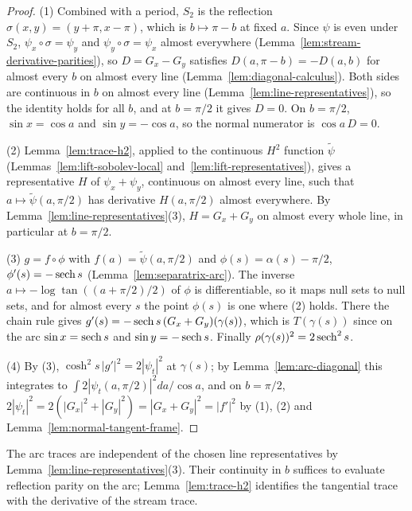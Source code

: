 \begin{proof}
\leanok
(1) Combined with a period, $S_2$ is the reflection $\sigma(x,y)=(y+\pi,x-\pi)$, which is
$b\mapsto\pi-b$ at fixed $a$. Since $\psi$ is even under $S_2$, $\psi_x\circ\sigma=\psi_y$ and
$\psi_y\circ\sigma=\psi_x$ almost everywhere (Lemma~\ref{lem:stream-derivative-parities}), so
$D=G_x-G_y$ satisfies $D(a,\pi-b)=-D(a,b)$ for almost every $b$ on almost every line
(Lemma~\ref{lem:diagonal-calculus}). Both sides are continuous in $b$ on almost every line
(Lemma~\ref{lem:line-representatives}), so the identity holds for all $b$, and at $b=\pi/2$ it
gives $D=0$. On $b=\pi/2$, $\sin x=\cos a$ and $\sin y=-\cos a$, so the normal numerator is
$\cos a\,D=0$.

(2) Lemma~\ref{lem:trace-h2}, applied to the continuous $H^2$ function $\tilde\psi$
(Lemmas~\ref{lem:lift-sobolev-local} and~\ref{lem:lift-representatives}), gives a representative
$H$ of $\psi_x+\psi_y$, continuous on almost every line, such that $a\mapsto\tilde\psi(a,\pi/2)$
has derivative $H(a,\pi/2)$ almost everywhere. By
Lemma~\ref{lem:line-representatives}(3), $H=G_x+G_y$ on almost every whole line, in particular
at $b=\pi/2$.

(3) $g=f\circ\phi$ with $f(a)=\tilde\psi(a,\pi/2)$ and $\phi(s)=\alpha(s)-\pi/2$,
$\phi'(s)=-\operatorname{sech} s$ (Lemma~\ref{lem:separatrix-arc}). The inverse
$a\mapsto-\log\tan((a+\pi/2)/2)$ of $\phi$ is differentiable, so it maps null sets to null
sets, and for almost every $s$ the point $\phi(s)$ is one where (2) holds. There the chain rule
gives $g'(s)=-\operatorname{sech} s\,(G_x+G_y)(\gamma(s))$, which is $T(\gamma(s))$ since on the arc
$\sin x=\operatorname{sech} s$ and $\sin y=-\operatorname{sech} s$. Finally $\rho(\gamma(s))^2=2\operatorname{sech}^2s$.

(4) By (3), $\cosh^2s\,|g'|^2=2|\psi_t|^2$ at $\gamma(s)$; by Lemma~\ref{lem:arc-diagonal} this
integrates to $\int 2|\psi_t(a,\pi/2)|^2da/\cos a$, and on $b=\pi/2$,
$2|\psi_t|^2=2(|G_x|^2+|G_y|^2)=|G_x+G_y|^2=|f'|^2$ by (1), (2) and
Lemma~\ref{lem:normal-tangent-frame}.
\end{proof}

\begin{remark}
The arc traces are independent of the chosen line representatives by
Lemma~\ref{lem:line-representatives}(3). Their continuity in $b$ suffices
to evaluate reflection parity on the arc; Lemma~\ref{lem:trace-h2}
identifies the tangential trace with the derivative of the stream trace.
\end{remark}

